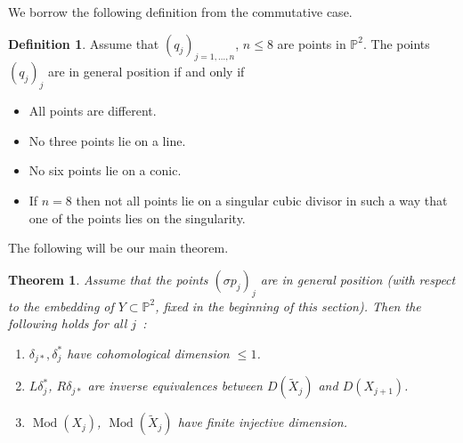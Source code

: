 \documentclass{amsproc}
\def \PP{{\mathbb P}}
\def\Qch{\operatorname {Mod}}
\newtheorem{theorems}[lemmas]{Theorem}
\theoremstyle{definition}
\newtheorem{definitions}[lemmas]{Definition}
\theoremstyle{remark}
\numberwithin{equation}{section}
\numberwithin{table}{section}
\numberwithin{figure}{section}
\begin{document}
We borrow the following definition from the commutative case.
\begin{definitions}  
\label{ref:11.1.2a}
Assume
  that $(q_{j})_{{j}=1,\ldots,n}$, $n\le 8$ are points in $\PP^2$.
The points $(q_{j})_{j}$ are in general position if and
  only if
\begin{itemize}
\item All points are different.
\item
No three  points lie on a line.
\item
No six  points lie on a conic.
\item If $n=8$ then not all points lie on a singular cubic divisor
 in such a way that one of the points lies on the
  singularity.
\end{itemize}

 


\end{definitions}
The following will be our main theorem.
\begin{theorems}
\label{ref:11.1.3a}
  Assume that the points $(\sigma p_{j})_{j}$ are in general position
  (with respect to the embedding of $Y\subset \PP^2$, fixed in the
  beginning of this section). Then the following holds for all ${j}$~:
\begin{enumerate}
\item $\delta_{{j}\ast},\delta^\ast_{j}$ have cohomological dimension $\le 1$.
\item $L\delta_{j}^\ast$, $R\delta_{{j}\ast}$ are inverse equivalences
 between $D(\tilde{X}_{j})$ and $D(X_{{j}+1})$.
  \item  $\Qch(X_{j})$, $\Qch(\tilde{X}_{j})$ have finite injective dimension.
\end{enumerate}
\end{theorems}
\end{document}
